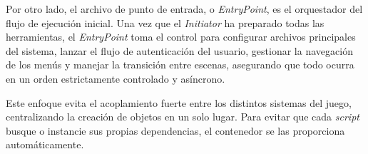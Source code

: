 Por otro lado, el archivo de punto de entrada, o \textit{EntryPoint}, es el orquestador del flujo de ejecución 
inicial. Una vez que el \textit{Initiator} ha preparado todas las herramientas, el \textit{EntryPoint} 
toma el control para configurar archivos principales del sistema, lanzar el flujo de autenticación del usuario, 
gestionar la navegación de los menús y manejar la transición entre escenas, asegurando que todo ocurra en un 
orden estrictamente controlado y asíncrono.

Este enfoque evita el acoplamiento fuerte entre los distintos sistemas del juego, centralizando la 
creación de objetos en un solo lugar. Para evitar que cada \textit{script} busque o instancie sus propias 
dependencias, el contenedor se las proporciona automáticamente.
